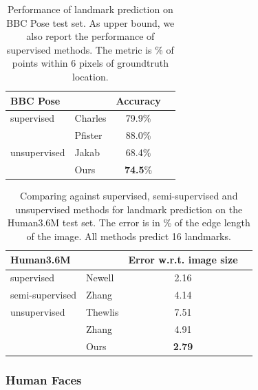 		\begin{table}[t]
			\caption{{
			Performance of landmark prediction on BBC Pose test set. As upper bound, we also report the performance of supervised methods.
			The metric is \% of points within 6 pixels of groundtruth location. %
			}}
			\label{tab:bbcpose}
			\centering
			\begin{tabular}{ll|cr}
			\hline
			BBC Pose &   &    { Accuracy}  \\
			 \hline
			supervised & Charles \cite{charles13bbcpose} &
			   79.9\%  \\ %
			 & Pfister \cite{pfister15flowingconv}  &
			  88.0\%  \\ \hline %
			unsupervised &Jakab \cite{jakab18} &
			 68.4\%  \\  %
			  &Ours &  \textbf{74.5}\% \\
			\hline
			\end{tabular}
		\end{table}
		\begin{table}[t]
			\caption{{Comparing against supervised, semi-supervised and unsupervised methods for landmark prediction on the Human3.6M test set. The
			error is in \% of the edge length of the image. All methods predict 16 landmarks.
			}}
			\label{tab:human}
			\centering
			\begin{tabular}{ll|cr}
			\hline
			 Human3.6M   & &  { Error w.r.t. image size}  \\
			 \hline
			 supervised & Newell \cite{newell16hourglass}
			  &2.16  \\  \hline
			 semi-supervised & Zhang \cite{zhang18}
			  & 4.14  \\ \hline
			 unsupervised & Thewlis \cite{thewlis17}
			 & 7.51  \\
			  & Zhang \cite{zhang18}
				& 4.91 \\
			  & Ours& \textbf{2.79} \\
			\hline
			\end{tabular}
		\end{table}

		\subsubsection{Human Faces}
